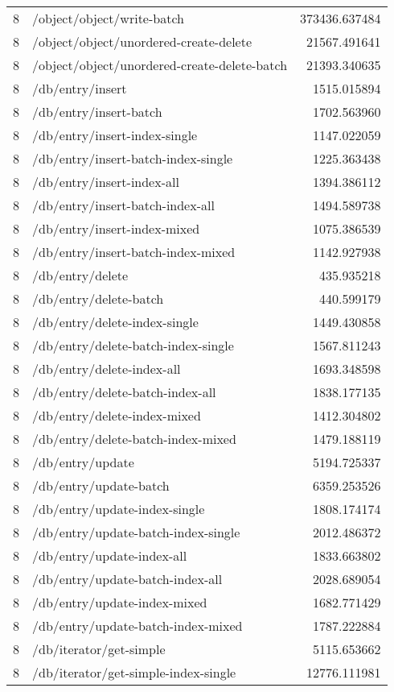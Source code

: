 \begin{longtable}{rlr}
8 & /object/object/write-batch & 373436.637484 \\
8 & /object/object/unordered-create-delete & 21567.491641 \\
8 & /object/object/unordered-create-delete-batch & 21393.340635 \\
8 & /db/entry/insert & 1515.015894 \\
8 & /db/entry/insert-batch & 1702.563960 \\
8 & /db/entry/insert-index-single & 1147.022059 \\
8 & /db/entry/insert-batch-index-single & 1225.363438 \\
8 & /db/entry/insert-index-all & 1394.386112 \\
8 & /db/entry/insert-batch-index-all & 1494.589738 \\
8 & /db/entry/insert-index-mixed & 1075.386539 \\
8 & /db/entry/insert-batch-index-mixed & 1142.927938 \\
8 & /db/entry/delete & 435.935218 \\
8 & /db/entry/delete-batch & 440.599179 \\
8 & /db/entry/delete-index-single & 1449.430858 \\
8 & /db/entry/delete-batch-index-single & 1567.811243 \\
8 & /db/entry/delete-index-all & 1693.348598 \\
8 & /db/entry/delete-batch-index-all & 1838.177135 \\
8 & /db/entry/delete-index-mixed & 1412.304802 \\
8 & /db/entry/delete-batch-index-mixed & 1479.188119 \\
8 & /db/entry/update & 5194.725337 \\
8 & /db/entry/update-batch & 6359.253526 \\
8 & /db/entry/update-index-single & 1808.174174 \\
8 & /db/entry/update-batch-index-single & 2012.486372 \\
8 & /db/entry/update-index-all & 1833.663802 \\
8 & /db/entry/update-batch-index-all & 2028.689054 \\
8 & /db/entry/update-index-mixed & 1682.771429 \\
8 & /db/entry/update-batch-index-mixed & 1787.222884 \\
8 & /db/iterator/get-simple & 5115.653662 \\
8 & /db/iterator/get-simple-index-single & 12776.111981 \\

\end{longtable}
